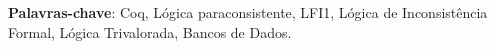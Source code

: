
\setlength{\absparsep}{18pt} %
\begin{resumo}
   
 \textbf{Palavras-chave}: Coq, Lógica paraconsistente, LFI1, Lógica de Inconsistência Formal, Lógica Trivalorada, Bancos de Dados.
\end{resumo}
